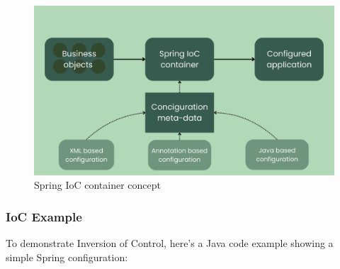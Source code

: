\documentclass{article}
\begin{document}
\begin{figure}[H]
    \centering
    \begin{framed}
        \includegraphics[width=0.9\linewidth]{images/sspring_ioc_container.png}
    \end{framed}
    \caption{Spring IoC container concept}
    \label{fig:spring-ioc-container}
\end{figure}

\subsubsection{IoC Example}

To demonstrate Inversion of Control, here’s a Java code example showing a simple Spring configuration:
\end{document}
